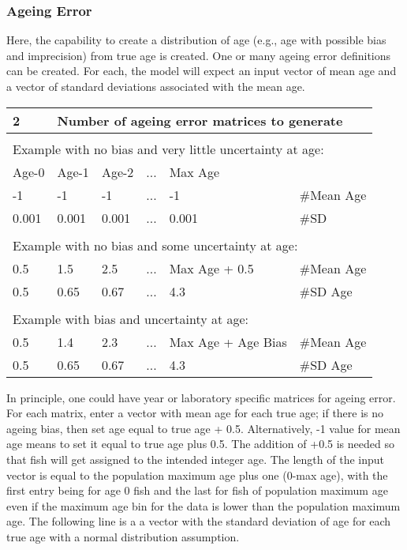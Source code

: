 \subsubsection{Ageing Error}
Here, the capability to create a distribution of age (e.g., age with possible bias and imprecision) from true age is created. One or many ageing error definitions can be created. For each, the model will expect an input vector of mean age and a vector of standard deviations associated with the mean age. 

\begin{center}
	\begin{tabular}{p{2cm} p{2cm} p{2cm} p{2cm} p{3.5cm} p{2.5cm} }
		\hline
		\multicolumn{1}{l}{2} & \multicolumn{5}{l}{Number of ageing error matrices to generate}\Tstrut\Bstrut\\
		\hline\\
		\multicolumn{6}{l}{Example with no bias and very little uncertainty at age:}\Tstrut\Bstrut\\
		\hline
		Age-0 & Age-1 & Age-2  &  ... & Max Age & \Tstrut\Bstrut\\
		\hline
		-1 & -1 & -1  & ... & -1  & \#Mean Age\Tstrut\\
		0.001 & 0.001 & 0.001 & ... & 0.001 & \#SD\Bstrut\\
		\hline\\
		\multicolumn{6}{l}{Example with no bias and some uncertainty at age:}\Tstrut\Bstrut\\
		\hline
		0.5 & 1.5 & 2.5 & ... & Max Age + 0.5 & \#Mean Age\Tstrut\\
		0.5 & 0.65 & 0.67 & ... & 4.3 & \#SD Age\Bstrut\\
		\hline\\
		\multicolumn{6}{l}{Example with bias and uncertainty at age:}\Tstrut\Bstrut\\
		\hline
		0.5 & 1.4 & 2.3 & ... & Max Age + Age Bias & \#Mean Age\Tstrut\\
		0.5 & 0.65 & 0.67 & ... & 4.3 & \#SD Age\Bstrut\\
		\hline
	\end{tabular}
\end{center}

In principle, one could have year or laboratory specific matrices for ageing error. For each matrix, enter a vector with mean age for each true age; if there is no ageing bias, then set age equal to true age + 0.5.  Alternatively, -1 value for mean age means to set it equal to true age plus 0.5.  The addition of +0.5 is needed so that fish will get assigned to the intended integer age. The length of the input vector is equal to the population maximum age plus one (0-max age), with the first entry being for age 0 fish and the last for fish of population maximum age even if the maximum age bin for the data is lower than the population maximum age. The following line is a a vector with the standard deviation of age for each true age with a normal distribution assumption.

